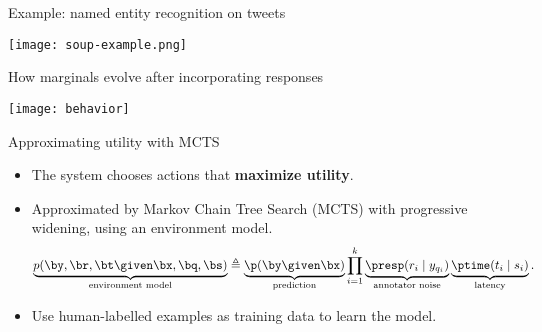 \begin{block}{Example: named entity recognition on tweets}
  \begin{center}
    \texttt{[image: soup-example.png]}
  \end{center}
\end{block}
\vfill

\begin{block}{How marginals evolve after incorporating responses}
  \begin{center}
    \texttt{[image: behavior]}
  \end{center}
\end{block}
\vfill

\begin{block}{Approximating utility with MCTS}
  \begin{itemize}
    \item The system chooses actions that \textbf{maximize utility}.
    \item Approximated by Markov Chain Tree Search (MCTS) with progressive widening, using an environment model.
  \begin{align*}
    \label{eqn:dynamics}
  \underbrace{p(\by, \br, \bt \given \bx, \bq, \bs)}_{\textrm{environment model}} \eqdef \underbrace{\p(\by \given \bx)}_{\textrm{prediction}} \prod_{i=1}^k \underbrace{\presp(r_i \mid y_{q_i})}_{\textrm{annotator noise}} \underbrace{\ptime(t_i \mid s_i)}_{\textrm{latency}}.
  \end{align*}
    \item Use human-labelled examples as training data to learn the model.
  \end{itemize}

\end{block}
\vfill

